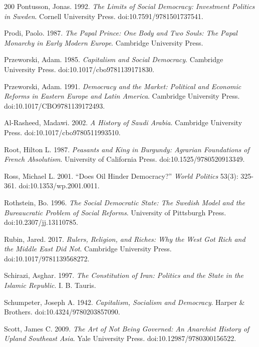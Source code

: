\documentclass[11pt,letterpaper]{article}
\theoremstyle{definition}
\theoremstyle{remark}
\begin{document}
\begin{thebibliography}{200}
Pontusson, Jonas. 1992. \emph{The Limits of Social Democracy: Investment Politics in Sweden}. Cornell University Press. doi:10.7591/9781501737541.

Prodi, Paolo. 1987. \emph{The Papal Prince: One Body and Two Souls: The Papal Monarchy in Early Modern Europe}. Cambridge University Press.

Przeworski, Adam. 1985. \emph{Capitalism and Social Democracy}. Cambridge University Press. doi:10.1017/cbo9781139171830.

Przeworski, Adam. 1991. \emph{Democracy and the Market: Political and Economic Reforms in Eastern Europe and Latin America}. Cambridge University Press. doi:10.1017/CBO9781139172493.

Al-Rasheed, Madawi. 2002. \emph{A History of Saudi Arabia}. Cambridge University Press. doi:10.1017/cbo9780511993510.

Root, Hilton L. 1987. \emph{Peasants and King in Burgundy: Agrarian Foundations of French Absolutism}. University of California Press. doi:10.1525/9780520913349.

Ross, Michael L. 2001. ``Does Oil Hinder Democracy?'' \emph{World Politics} 53(3): 325-361. doi:10.1353/wp.2001.0011.

Rothstein, Bo. 1996. \emph{The Social Democratic State: The Swedish Model and the Bureaucratic Problem of Social Reforms}. University of Pittsburgh Press. doi:10.2307/jj.13110785.

Rubin, Jared. 2017. \emph{Rulers, Religion, and Riches: Why the West Got Rich and the Middle East Did Not}. Cambridge University Press. doi:10.1017/9781139568272.

Schirazi, Asghar. 1997. \emph{The Constitution of Iran: Politics and the State in the Islamic Republic}. I. B. Tauris.

Schumpeter, Joseph A. 1942. \emph{Capitalism, Socialism and Democracy}. Harper \& Brothers. doi:10.4324/9780203857090.

Scott, James C. 2009. \emph{The Art of Not Being Governed: An Anarchist History of Upland Southeast Asia}. Yale University Press. doi:10.12987/9780300156522.


\end{thebibliography}
\end{document}

